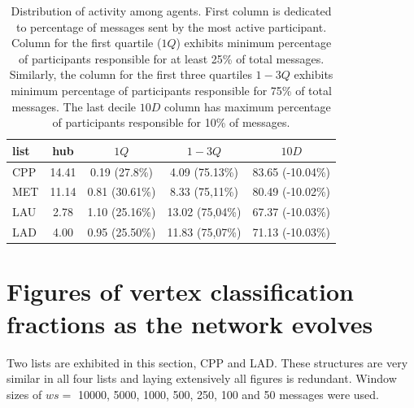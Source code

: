 \documentclass[%
 aip,
 jmp,%
 amsmath,amssymb,
 reprint,%
]{revtex4-1}
\begin{document}
\begin{table}
    \caption{Distribution of activity among agents. First column is dedicated to percentage of messages sent by the most active participant. Column for the first quartile ($1Q$) exhibits minimum percentage of participants responsible for at least 25\% of total messages. Similarly, the column for the first three quartiles $1-3Q$ exhibits minimum percentage of participants responsible for 75\% of total messages. The last decile $10D$ column has maximum percentage of participants responsible for 10\% of messages.}
\begin{center}
    \begin{tabular}{ | l ||  c | c | c | c | }
        \hline
        list & hub & $ 1Q $ & $ 1-3Q $ & $10D$ \\ \hline
    CPP & 14.41 & 0.19 (27.8\%) & 4.09 (75.13\%) & 83.65 (-10.04\%)   \\ 
    MET & 11.14 & 0.81 (30.61\%) & 8.33 (75,11\%) & 80.49 (-10.02\%)  \\ 
    LAU & 2.78 & 1.10 (25.16\%) & 13.02 (75,04\%) & 67.37 (-10.03\%) \\ 
    LAD & 4.00 & 0.95 (25.50\%) & 11.83 (75,07\%) & 71.13 (-10.03\%) \\\hline
    \end{tabular}
\end{center}
\label{autores}
\end{table}



\clearpage
\section{Figures of vertex classification fractions as the network evolves}\label{figures}

Two lists are exhibited in this section, CPP and LAD. These structures are very similar in all
four lists and laying extensively all figures is redundant. Window sizes of $ws =$ 10000, 5000,
1000, 500, 250, 100 and 50 messages were used.
\end{document}

